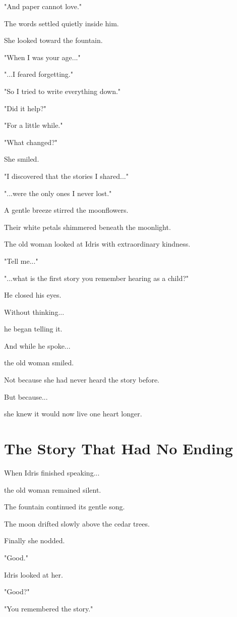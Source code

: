 \documentclass[12pt,openany]{book}
\begin{document}
"And paper cannot love."

The words settled quietly inside him.

She looked toward the fountain.

"When I was your age..."

"...I feared forgetting."

"So I tried to write everything down."

"Did it help?"

"For a little while."

"What changed?"

She smiled.

"I discovered that the stories I shared..."

"...were the only ones I never lost."

A gentle breeze stirred the moonflowers.

Their white petals shimmered beneath the moonlight.

The old woman looked at Idris with extraordinary kindness.

"Tell me..."

"...what is the first story you remember hearing as a child?"

He closed his eyes.

Without thinking...

he began telling it.

And while he spoke...

the old woman smiled.

Not because she had never heard the story before.

But because...

she knew it would now live one heart longer.
\section*{The Story That Had No Ending}

When Idris finished speaking...

the old woman remained silent.

The fountain continued its gentle song.

The moon drifted slowly above the cedar trees.

Finally she nodded.

"Good."

Idris looked at her.

"Good?"

"You remembered the story."
\end{document}
